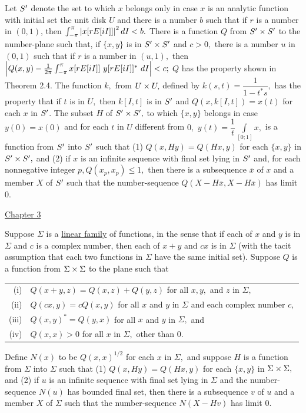 Let $S^{\prime}$ denote the set to which $x$ belongs only in case $x$ is an analytic function with initial set the unit disk $U$ and there is a number $b$ such that if $r$ is a number in $(0, 1)$, then $\int_{-\pi}^{\pi} \left|x[rE[iI]]\right|^{2}dI < b.$    There is a function $Q$ from $S^{\prime} \times S^{\prime}$ to the number-plane such that, if $\{x,y\}$ is in $S^{\prime} \times S^{\prime}$ and $c > 0,$ there is a number $u$ in $(0, 1)$ such that if $r$ is a number in $(u, 1),$ then $\left|Q(x,y) - \frac{1}{2\pi}\int_{-\pi}^{\pi}x[rE[iI]]~y[rE[iI]]^{*}~dI\right| < c;$ $Q$ has the property shown in Theorem 2.4.   The function $k,$ from $U \times U,$  defined by $k(s,t) = \dfrac{1}{1-t^{*}s},$ has the property that if $t$ is in $U,$ then $k[I,t]$ is in $S^{\prime}$ and $Q(x,k[I,t]) = x(t)$ for each $x$ in $S^{\prime}$.  \nl
The subset $H$ of $S^{\prime} \times  S^{\prime},$ to which $\{x,y\}$ belongs in case $y(0) = x(0)$ and for each $t$ in $U$ different from $0,$ $y(t) = \dfrac{1}{t}\underset{[0;1]}{\int} x,$ is a function from $S^{\prime}$ into $S^{\prime}$ such that\nl
\indent (1) $Q(x,Hy) = Q(Hx,y)$ for each $\{x,y\}$ in $S^{\prime} \times S^{\prime},$ and \nl
\indent (2) if $x$ is an infinite sequence with final set lying in $S^{\prime}$ and, for each nonnegative integer $p, Q(x_{p},x_{p}) \leq 1,$ then there is a subsequence %
 $\overline{x}$ of $x$ and a member  $X$ of $S^{\prime}$  such that the number-sequence $Q(X-H\overline{x},X-H\overline{x})$ has limit $0.$\np

\begin{center}
\underline{Chapter 3}
\end{center}

 Suppose $\Sigma$ is a \underline{linear family} of functions, in the sense that if each of $x$ and $y$ is in $\Sigma$ and $c$ is a complex number, then each of $x + y$ and $cx$ is in $\Sigma$ (with the tacit assumption that each two functions in $\Sigma$ have the same initial set).  Suppose $Q$ is a function from $\Sigma \times \Sigma$ to the plane such that\nl
 \begin{tabular}{r l}
(i)&$Q(x + y,z) = Q(x,z) + Q(y,z)$ for all $x, y,$ and $z$ in $\Sigma,$\\
(ii)&$Q(cx,y) = cQ(x,y)$ for all $x$ and $y$ in $\Sigma$ and each complex number $c,$\\
(iii)&$Q(x,y)^{*} = Q(y,x)$ for all $x$ and $y$ in $\Sigma,$ and \\
(iv)&$Q(x,x) > 0$ for all $x$ in $\Sigma,$ other than $0.$
 \end{tabular}\nl
 Define $N(x)$ to be $Q(x,x)^{1/2}$ for each $x$ in $\Sigma,$ and suppose $H$ is a function from $\Sigma$ into $\Sigma$ such that\nl
 \indent (1) $Q(x,Hy) = Q(Hx,y)$ for each $\{x,y\}$ in $\Sigma \times \Sigma,$ and \nl
 \indent (2) if $u$ is an infinite sequence with final set lying in $\Sigma$ and the number-sequence $N(u)$ has bounded final set, then there is a subsequence $v$ of $u$ and a member $X$ of $\Sigma$ such that the number-sequence $N(X - Hv)$ has limit $0.$\nl

